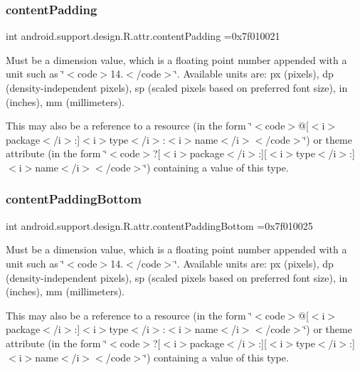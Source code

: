 \subsubsection{\texorpdfstring{content\+Padding}{contentPadding}}
{\footnotesize\ttfamily int android.\+support.\+design.\+R.\+attr.\+content\+Padding =0x7f010021\hspace{0.3cm}{\ttfamily [static]}}

Must be a dimension value, which is a floating point number appended with a unit such as \char`\"{}$<$code$>$14.\+5sp$<$/code$>$\char`\"{}. Available units are\+: px (pixels), dp (density-\/independent pixels), sp (scaled pixels based on preferred font size), in (inches), mm (millimeters). 

This may also be a reference to a resource (in the form \char`\"{}$<$code$>$@\mbox{[}$<$i$>$package$<$/i$>$\+:\mbox{]}$<$i$>$type$<$/i$>$\+:$<$i$>$name$<$/i$>$$<$/code$>$\char`\"{}) or theme attribute (in the form \char`\"{}$<$code$>$?\mbox{[}$<$i$>$package$<$/i$>$\+:\mbox{]}\mbox{[}$<$i$>$type$<$/i$>$\+:\mbox{]}$<$i$>$name$<$/i$>$$<$/code$>$\char`\"{}) containing a value of this type. \mbox{\label{classandroid_1_1support_1_1design_1_1R_1_1attr_a4b9aa67d8274a4e16423c353d91f3276}} 
\subsubsection{\texorpdfstring{content\+Padding\+Bottom}{contentPaddingBottom}}
{\footnotesize\ttfamily int android.\+support.\+design.\+R.\+attr.\+content\+Padding\+Bottom =0x7f010025\hspace{0.3cm}{\ttfamily [static]}}

Must be a dimension value, which is a floating point number appended with a unit such as \char`\"{}$<$code$>$14.\+5sp$<$/code$>$\char`\"{}. Available units are\+: px (pixels), dp (density-\/independent pixels), sp (scaled pixels based on preferred font size), in (inches), mm (millimeters). 

This may also be a reference to a resource (in the form \char`\"{}$<$code$>$@\mbox{[}$<$i$>$package$<$/i$>$\+:\mbox{]}$<$i$>$type$<$/i$>$\+:$<$i$>$name$<$/i$>$$<$/code$>$\char`\"{}) or theme attribute (in the form \char`\"{}$<$code$>$?\mbox{[}$<$i$>$package$<$/i$>$\+:\mbox{]}\mbox{[}$<$i$>$type$<$/i$>$\+:\mbox{]}$<$i$>$name$<$/i$>$$<$/code$>$\char`\"{}) containing a value of this type. \mbox{\label{classandroid_1_1support_1_1design_1_1R_1_1attr_af303f4ec3e2b84dffd727eb2ec6b14e3}} 
